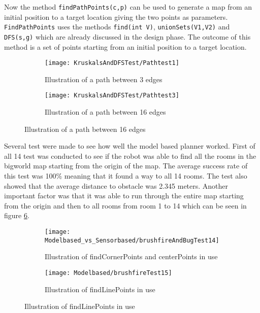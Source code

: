 \documentclass[../Head/Main.tex]{subfiles}
\begin{document}
Now the method \texttt{findPathPoints(c,p)} can be used to generate a map from an initial position to a target location giving the two points as parameters. \texttt{FindPathPoints} uses the methods \texttt{find(int V)}, \texttt{unionSets(V1,V2)} and \texttt{DFS(s,g)} which are already discussed in the design phase. The outcome of this method is a set of points starting from an initial position to a target location.        
  \begin{figure}[H]
   \begin{subfigure}[b]{0.49\textwidth}
    \centering
    \texttt{[image: KruskalsAndDFSTest/Pathtest1]}
    \caption{Illustration of a path between 3 edges}
    \label{fig:Vertexes}
  \end{subfigure}
  \hfill
   \begin{subfigure}[b]{0.49\textwidth}
    \centering
    \texttt{[image: KruskalsAndDFSTest/Pathtest3]}
    \caption{Illustration of a path between 16 edges}
    \label{fig:VertexesAndEdges}
  \end{subfigure}
  \end{figure}  

Several test were made to see how well the model based planner worked. First of all 14 test was conducted to see if the robot was able to find all the rooms in the bigworld map starting from the origin of the map. The average success rate of this test was 100\% meaning that it found a way to all 14 rooms. The test also showed that the average distance to obstacle was 2.345 meters. Another important factor was that it was able to run through the entire map starting from the origin and then to all rooms from room 1 to 14 which can be seen in figure \ref{fig:brushfireCompletePath}. 

  \begin{figure}[H]
   \begin{subfigure}[b]{0.49\textwidth}
    \centering
    \texttt{[image: Modelbased\_vs\_Sensorbased/brushfireAndBugTest14]}
    \caption{Illustration of findCornerPoints and centerPoints in use}
    \label{fig:brushfireToRoom14}
  \end{subfigure}
  \hfill
   \begin{subfigure}[b]{0.49\textwidth}
    \centering
    \texttt{[image: Modelbased/brushfireTest15]}
    \caption{Illustration of findLinePoints in use}
    \label{fig:brushfireCompletePath}
  \end{subfigure}
  \end{figure}  
\end{document}
